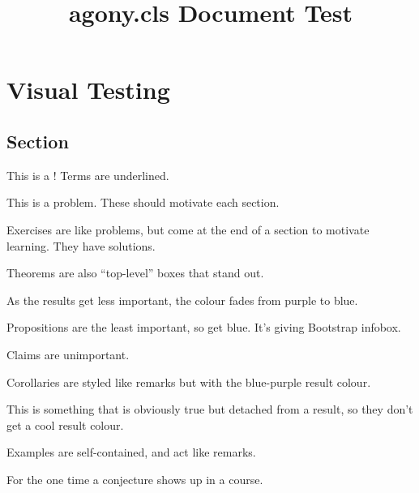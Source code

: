 \documentclass[notes,tikz]{agony}
\title{agony.cls Document Test}
\begin{document}
\chapter{Visual Testing}

\section{Section}

\begin{defn}[term]
  This is a ! Terms are underlined.
\end{defn}

\begin{problem}
  This is a problem. These should motivate each section.
\end{problem}

\begin{xca}
  Exercises are like problems, but come at the end of a section to motivate learning.
  They have solutions.
\end{xca}

\begin{theorem}
  Theorems are also ``top-level'' boxes that stand out.
\end{theorem}

\begin{lemma}
  As the results get less important, the colour fades from purple to blue.
\end{lemma}

\begin{prop}
  Propositions are the least important, so get blue.
  It's giving Bootstrap infobox.
\end{prop}

\begin{claim}
  Claims are unimportant.
\end{claim}

\begin{corollary}
  Corollaries are styled like remarks but with the blue-purple result colour.
\end{corollary}

\begin{remark}
  This is something that is obviously true but detached from a result,
  so they don't get a cool result colour.
\end{remark}

\begin{example}
  Examples are self-contained, and act like remarks.
\end{example}

\begin{conjecture}
  For the one time a conjecture shows up in a course.
\end{conjecture}
\end{document}
